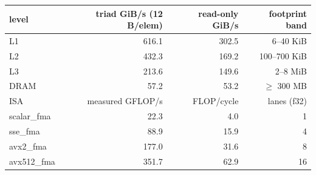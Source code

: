 \begin{tabular}{lrrr}
\toprule
level & triad GiB/s (12 B/elem) & read-only GiB/s & footprint band \\
\midrule
L1 & 616.1 & 302.5 & 6--40 KiB \\
L2 & 432.3 & 169.2 & 100--700 KiB \\
L3 & 213.6 & 149.6 & 2--8 MiB \\
DRAM & 57.2 & 53.2 & $\geq$ 300 MB \\
\midrule
ISA & measured GFLOP/s & FLOP/cycle & lanes (f32) \\
\midrule
scalar\_fma & 22.3 & 4.0 & 1 \\
sse\_fma & 88.9 & 15.9 & 4 \\
avx2\_fma & 177.0 & 31.6 & 8 \\
avx512\_fma & 351.7 & 62.9 & 16 \\
\bottomrule
\end{tabular}
